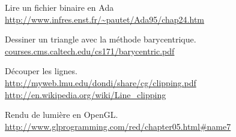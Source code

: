 \documentclass[10pt]{article}
\begin{document}
Lire un fichier binaire en Ada \\
\url{http://www.infres.enst.fr/~pautet/Ada95/chap24.htm}

Dessiner un triangle avec la méthode barycentrique. \\
\url{courses.cms.caltech.edu/cs171/barycentric.pdf}

Découper les lignes. \\
\url{http://myweb.lmu.edu/dondi/share/cg/clipping.pdf} \\
\url{http://en.wikipedia.org/wiki/Line_clipping}

Rendu de lumière en OpenGL. \\
\url{http://www.glprogramming.com/red/chapter05.html#name7}
\end{document}
